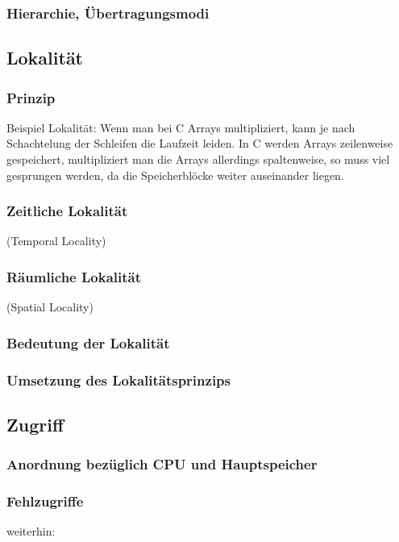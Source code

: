 \subsubsection{Hierarchie, Übertragungsmodi}

\subsection{Lokalität}
\subsubsection{Prinzip}
Beispiel Lokalität: Wenn man bei C Arrays multipliziert, kann je nach Schachtelung der Schleifen die Laufzeit leiden. In C werden Arrays zeilenweise gespeichert, multipliziert man die Arrays allerdings spaltenweise, so muss viel gesprungen werden, da die Speicherblöcke weiter auseinander liegen.

\subsubsection{Zeitliche Lokalität}
(Temporal Locality)

\subsubsection{Räumliche Lokalität}
(Spatial Locality)

\subsubsection{Bedeutung der Lokalität}

\subsubsection{Umsetzung des Lokalitätsprinzips}

\subsection{Zugriff}
\subsubsection{Anordnung bezüglich CPU und Hauptspeicher}
\subsubsection{Fehlzugriffe}
weiterhin:
